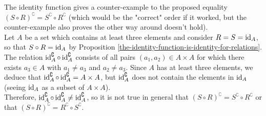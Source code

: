 \begin{remark}
	The identity function gives a counter-example to the proposed equality $(S \circ R)^{\complement} = S^{\complement} \circ R^{\complement}$ (which would be the "correct" order if it worked, but the counter-example also proves the other way around doesn't hold). 
	\\

	Let $A$ be a set which contains at least three elements and consider $R = S = \operatorname{\mathrm{id}}_{A}$, so that $S \circ R = \operatorname{\mathrm{id}}_{A}$ by Proposition \autoref{the-identity-function-is-identity-for-relations}. The relation $\operatorname{\mathrm{id}}_{A}^{\complement} \circ \operatorname{\mathrm{id}}_{A}^{\complement}$ consists of all pairs $(a_1,a_2) \in A \times A$ for which there exists $a_3 \in A$ with $a_1 \neq a_3$ and $a_2 \neq a_3$. Since $A$ has at least three elements, we deduce that $\operatorname{\mathrm{id}}_{A}^{\complement} \circ \operatorname{\mathrm{id}}_{A}^{\complement} = A \times A$, but $\operatorname{\mathrm{id}}_{A}^{\complement}$ does not contain the elements in $\operatorname{\mathrm{id}}_{A}$ (seeing $\operatorname{\mathrm{id}}_{A}$ as a subset of $A \times A$). 
	\\
	
	Therefore, $\operatorname{\mathrm{id}}_{A}^{\complement} \circ \operatorname{\mathrm{id}}_{A}^{\complement} \neq \operatorname{\mathrm{id}}_{A}^{\complement}$, so it is not true in general that $(S \circ R)^{\complement} = S^{\complement} \circ R^{\complement}$ or that $(S \circ R)^{\complement} = R^{\complement} \circ S^{\complement}$.
\end{remark}

